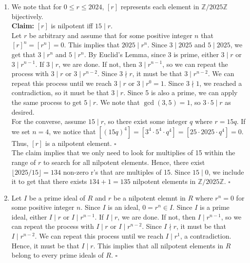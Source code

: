 \documentclass{article}
\begin{document}
\begin{enumerate}
\begin{enumerate}
    \item 
    We note that for $0 \leq r \leq 2024$, $[r]$ represents each element in $\mathbb{Z}/2025\mathbb{Z}$ bijectively. \\
    
    \textbf{Claim:} $[r]$ is nilpotent iff $15 \mid r$. \\

    Let $r$ be arbitrary and assume that for some positive integer $n$ that $[r]^n = [r^n] = 0$. This implies that $2025 \mid r^n$. Since $3 \mid 2025$ and $5 \mid 2025$, we get that $3 \mid r^n$ and $5 \mid r^n$. By Euclid's Lemma, since 3 is prime, either $3 \mid r$ or $3 \mid r^{n-1}$. If $3 \mid r$, we are done. If not, then $3 \mid r^{n-1}$, so we can repeat the process with $3 \mid r$ or $3 \mid r^{n-2}$. Since $3 \nmid r$, it must be that $3 \mid r^{n-2}$. We can repeat this process until we reach $3 \mid r$ or $3 \mid r^0 = 1$. Since $3 \nmid 1$, we reached a contradiction, so it must be that $3 \mid r$. Since 5 is also a prime, we can apply the same process to get $5 \mid r$. We note that $\gcd(3,5) = 1$, so $3\cdot 5 \mid r$ as desired. \\

    For the converse, assume $15 \mid r$, so there exist some integer $q$ where $r = 15q$. If we set $n = 4$, we notice that $[(15q)^4] = [3^4 \cdot 5^4 \cdot q^4] = [25 \cdot 2025 \cdot q^4] = 0$. Thus, $[r]$ is a nilpotent element. \hfill $\square$ \\

    The claim implies that we only need to look for multiplies of 15 within the range of $r$ to search for all nilpotent elements. Hence, there exist $\lfloor 2025/15 \rfloor = 134$ non-zero r's that are multiples of 15. Since $15 \mid 0$, we include it to get that there exists $134 + 1 = 135$ nilpotent elements in $\mathbb{Z} / 2025\mathbb{Z}$. \hfill $\square$ \\

    \item 
    Let $I$ be a prime ideal of $R$ and $r$ be a nilpotent elemnt in $R$ where $r^n = 0$ for some positive integer $n$. Since $I$ is an ideal, $0 = r^n \in I$. Since $I$ is a prime ideal, either $I \mid r$ or $I \mid r^{n-1}$. If $I \mid r$, we are done. If not, then $I \mid r^{n-1}$, so we can repeat the process with $I \mid r$ or $I \mid r^{n-2}$. Since $I \nmid r$, it must be that $I \mid r^{n-2}$. We can repeat this process until we reach $I \mid r^1$, a contradiction. Hence, it must be that $I \mid r$. This implies that all nilpotent elements in $R$ belong to every prime ideals of $R$. \hfill $\square$ \\


\end{enumerate}
\end{enumerate}
\end{document}
